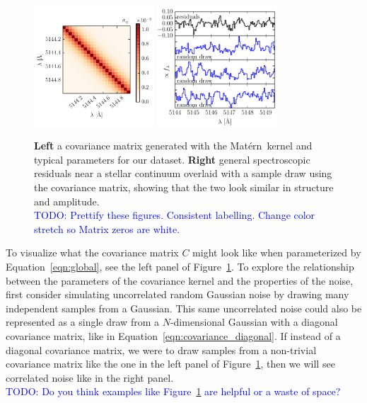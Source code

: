 \documentclass[iop,floatfix]{emulateapj}
\newcommand{\matern}{Mat\'{e}rn}
\newcommand{\todo}[1]{ \textcolor{Blue}{\\TODO: #1}}
\begin{document}
\begin{figure}[!htb]
\begin{center}
\includegraphics[width=0.4\textwidth]{figs/matern_matrix}
\includegraphics[width=0.4\textwidth]{figs/matern_draw}
\caption{\textbf{Left} a covariance matrix generated with the \matern\ kernel
 and typical parameters for our dataset.  
 \textbf{Right} general spectroscopic residuals near a stellar continuum
  overlaid with a sample draw using the covariance matrix, showing that the two
  look similar in structure and amplitude. 
  \protect \todo{Prettify these figures. Consistent labelling. Change
  color stretch so Matrix zeros are white.}}
\label{fig:matern}
\end{center}
\end{figure}

To visualize what the covariance matrix $C$ might look like when parameterized
 by Equation~\ref{eqn:global}, see the left panel of Figure~\ref{fig:matern}. 
To explore the relationship between the parameters of the covariance kernel and
 the properties of the noise, first consider simulating uncorrelated random
 Gaussian noise by drawing many independent samples from a Gaussian. 
This same uncorrelated noise could also be represented as a single draw from a
 $N$-dimensional Gaussian with a diagonal covariance matrix, like in
 Equation~\ref{eqn:covariance_diagonal}. 
If instead of a diagonal covariance matrix, we were to draw samples from a
 non-trivial covariance matrix like the one in the left panel of
 Figure~\ref{fig:matern}, then we will see correlated noise like in the right
 panel. 
\todo{Do you think examples like Figure~\ref{fig:matern} are helpful or a waste
 of space?}
\end{document}
